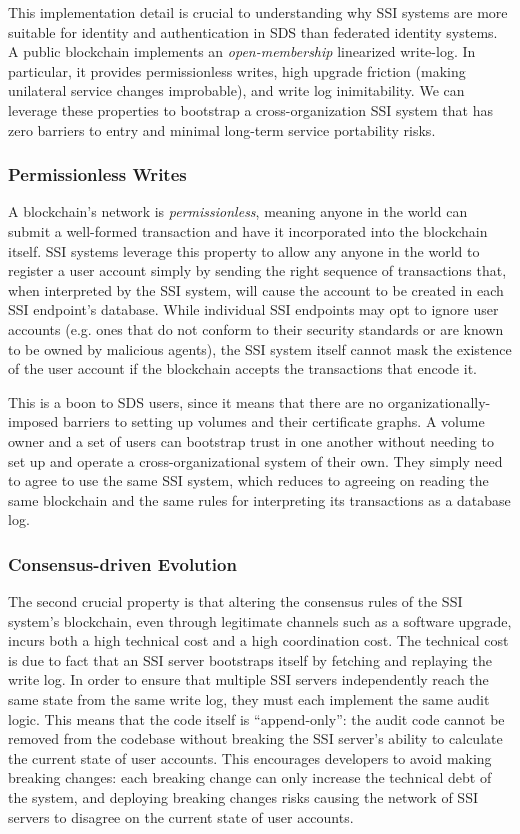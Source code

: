 This implementation detail is crucial to understanding why SSI systems are
more suitable for identity and authentication in SDS than federated identity
systems.  A public blockchain implements an \emph{open-membership} linearized
write-log.  In particular, it provides permissionless
writes, high upgrade friction (making unilateral service changes improbable),
and write log inimitability.  We can leverage these properties to bootstrap a
cross-organization SSI system that has zero barriers to entry and minimal
long-term service portability risks.

\subsubsection{Permissionless Writes}

A blockchain's network is \emph{permissionless}, meaning anyone in the world can submit a
well-formed transaction and have it incorporated into the blockchain itself.
SSI systems leverage this property to allow any anyone in the world to register a user account
simply by sending the right sequence of transactions that, when interpreted by the SSI system, will
cause the account to be created in each SSI endpoint's database.
While individual SSI endpoints may opt to ignore user accounts (e.g. ones that do not conform to their security
standards or are known to be owned by malicious agents), the SSI system itself cannot
mask the existence of the user account if the blockchain accepts the
transactions that encode it.

This is a boon to SDS users, since it means
that there are no organizationally-imposed barriers to setting up volumes and
their certificate graphs.  A volume owner and a set of users can bootstrap trust
in one another without needing to set up and operate a cross-organizational
system of their own.  They simply need to agree to use the same SSI system,
which reduces to agreeing on reading the same blockchain and the same rules for
interpreting its transactions as a database log.

\subsubsection{Consensus-driven Evolution}

The second crucial property is that altering the consensus rules of the SSI system's
blockchain, even through legitimate channels such as a 
software upgrade, incurs both a high technical cost and a high coordination cost.
The technical cost is due to fact that an SSI server
bootstraps itself by fetching and replaying the write log.  In order to
ensure that multiple SSI servers independently reach the same state from the
same write log, they must each implement the same audit logic.  This means that
the code itself is ``append-only'':  the audit code cannot be removed from
the codebase without breaking the SSI server's ability to calculate the current
state of user accounts.  This encourages developers to avoid making breaking
changes: each breaking change can only increase the technical debt of the
system, and deploying breaking changes risks causing the network of SSI servers
to disagree on the current state of user accounts.

